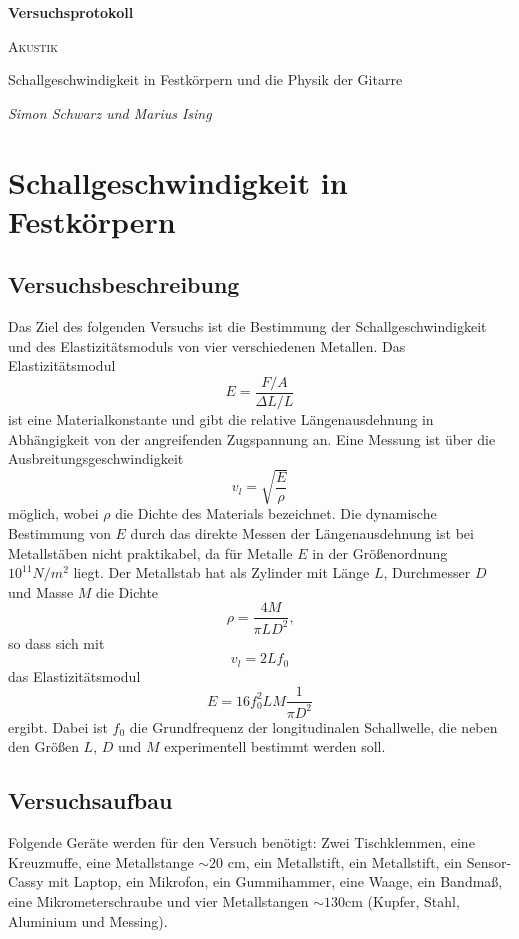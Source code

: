 \documentclass[a4paper, 12pt]{scrartcl}
\begin{document}
\begin{titlepage}
	\centering
	{\Huge\bfseries Versuchsprotokoll\par}
	\vspace{2cm}
	{\scshape\LARGE Akustik \par}
	\vspace{1cm}
	{\Large Schallgeschwindigkeit in Festkörpern und die Physik der Gitarre\par}
	\vfill
	{\large\itshape Simon Schwarz und Marius Ising\par}

	\vfill
\end{titlepage}

\tableofcontents
\newpage

\section{Schallgeschwindigkeit in Festkörpern}


\subsection{Versuchsbeschreibung}

Das Ziel des folgenden Versuchs ist die Bestimmung der Schallgeschwindigkeit und des Elastizitätsmoduls von vier verschiedenen Metallen. Das Elastizitätsmodul 
$$E = \frac{F/A}{\Delta L/L}$$
ist eine Materialkonstante und gibt die relative Längenausdehnung in Abhängigkeit von der angreifenden Zugspannung an. Eine Messung ist über die Ausbreitungsgeschwindigkeit 
$$v_l = \sqrt{\frac{E}{\rho}}$$
möglich, wobei $\rho$ die Dichte des Materials bezeichnet. Die dynamische Bestimmung von $E$ durch das direkte Messen der Längenausdehnung ist bei Metallstäben nicht praktikabel, da für Metalle $E$ in der Größenordnung $10^{11} N/m^2$ liegt. Der Metallstab hat als Zylinder mit Länge $L$, Durchmesser $D$ und Masse $M$ die Dichte
$$\rho = \frac{4M}{\pi LD^2}\text{,}$$
so dass sich mit
$$v_l = 2L f_0$$
das Elastizitätsmodul
$$E = 16 f_0^2 LM \frac{1}{\pi D^2}$$
ergibt. Dabei ist $f_0$ die Grundfrequenz der longitudinalen Schallwelle, die neben den Größen $L$, $D$ und $M$ experimentell bestimmt werden soll.

\subsection{Versuchsaufbau}

Folgende Geräte werden für den Versuch benötigt: Zwei Tischklemmen, eine Kreuzmuffe, eine Metallstange $\sim 20$ cm, ein Metallstift, ein Metallstift, ein Sensor-Cassy mit Laptop, ein Mikrofon, ein Gummihammer, eine Waage, ein Bandmaß, eine Mikrometerschraube und vier Metallstangen $\sim 130$cm (Kupfer, Stahl, Aluminium und Messing).
\end{document}
